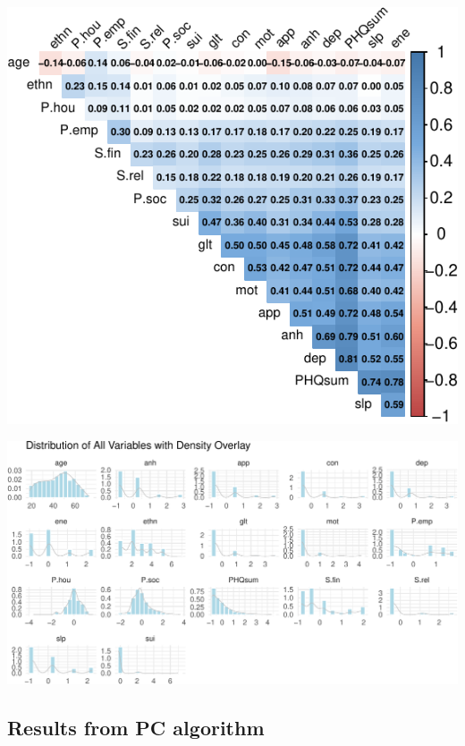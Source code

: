 \documentclass[
]{article}
\begin{document}
\begin{center}
\includegraphics{draft_v1_files/figure-pdf/unnamed-chunk-17-1.pdf}
\end{center}

\begin{center}
\includegraphics{draft_v1_files/figure-pdf/unnamed-chunk-18-1.pdf}
\end{center}

\subsection{Results from PC algorithm}\label{results-from-pc-algorithm}
\end{document}
